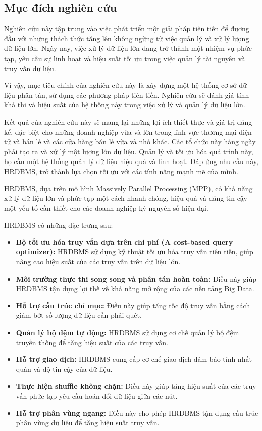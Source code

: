 \documentclass{article}[14pt]
\begin{document}
{\subsection{Mục đích nghiên cứu }

Nghiên cứu này tập trung vào việc phát triển một giải pháp tiên tiến để đương đầu với những thách thức tăng lên không ngừng từ việc quản lý và xử lý lượng dữ liệu lớn. Ngày nay, việc xử lý dữ liệu lớn đang trở thành một nhiệm vụ phức tạp, yêu cầu sự linh hoạt và hiệu suất tối ưu trong việc quản lý tài nguyên và truy vấn dữ liệu.

Vì vậy, mục tiêu chính của nghiên cứu này là xây dựng một hệ thống cơ sở dữ liệu phân tán, sử dụng các phương pháp tiên tiến. Nghiên cứu sẽ đánh giá tính khả thi và hiệu suất của hệ thống này trong việc xử lý và quản lý dữ liệu lớn.

Kết quả của nghiên cứu này sẽ mang lại những lợi ích thiết thực và giá trị đáng kể, đặc biệt cho những doanh nghiệp vừa và lớn trong lĩnh vực thương mại điện tử và bán lẻ và các cửa hàng bán lẻ vừa và nhỏ khác. Các tổ chức này hàng ngày phải tạo ra và xử lý một lượng lớn dữ liệu. Quản lý và tối ưu hóa quá trình này, họ cần một hệ thống quản lý dữ liệu hiệu quả và linh hoạt. Đáp ứng nhu cầu này, HRDBMS, trở thành lựa chọn tối ưu với các tính năng mạnh mẽ của mình.

HRDBMS, dựa trên mô hình Massively Parallel Processing (MPP), có khả năng xử lý dữ liệu lớn và phức tạp một cách nhanh chóng, hiệu quả và đáng tin cậy một yếu tố cần thiết cho các doanh nghiệp kỷ nguyên số hiện đại.

HRDBMS có những đặc trưng sau:

\begin{itemize}
\item \textbf{Bộ tối ưu hóa truy vấn dựa trên chi phí (A cost-based query optimizer):} HRDBMS sử dụng kỹ thuật tối ưu hóa truy vấn tiên tiến, giúp nâng cao hiệu suất của các truy vấn trên dữ liệu lớn.
\item \textbf{Môi trường thực thi song song và phân tán hoàn toàn: }Điều này giúp HRDBMS tận dụng lợi thế về khả năng mở rộng của các nền tảng Big Data.
\item \textbf{Hỗ trợ cấu trúc chỉ mục: }Điều này giúp tăng tốc độ truy vấn bằng cách giảm bớt số lượng dữ liệu cần phải quét.
\item \textbf{Quản lý bộ đệm tự động:} HRDBMS sử dụng cơ chế quản lý bộ đệm truyền thống để tăng hiệu suất của các truy vấn.
\item \textbf{Hỗ trợ giao dịch: }HRDBMS cung cấp cơ chế giao dịch đảm bảo tính nhất quán và độ tin cậy của dữ liệu.
\item \textbf{T\textbf{hực hiện shuffle không chặn:} }Điều này giúp tăng hiệu suất của các truy vấn phức tạp yêu cầu hoán đổi dữ liệu giữa các nút.
\item \textbf{Hỗ trợ phân vùng ngang:} Điều này cho phép HRDBMS tận dụng cấu trúc phân vùng dữ liệu để tăng hiệu suất truy vấn.
\end{itemize}

}
\end{document}
